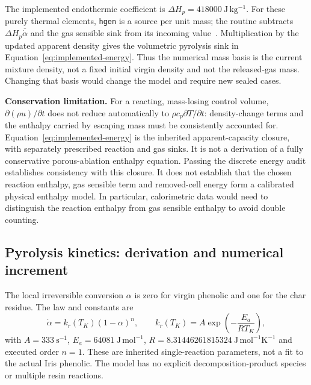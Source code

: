 The implemented endothermic coefficient is $\Delta H_p=418000\ \mathrm{J\,kg^{-1}}$. For these purely thermal elements, \texttt{hgen} is a source per unit mass; the routine subtracts $\Delta H_p\overline{\dot\alpha}$ and the gas sensible sink from its incoming value~\cite{ansysusermat}. Multiplication by the updated apparent density gives the volumetric pyrolysis sink in Equation~\eqref{eq:implemented-energy}. Thus the numerical mass basis is the current mixture density, not a fixed initial virgin density and not the released-gas mass. Changing that basis would change the model and require new sealed cases.

\textbf{Conservation limitation.} For a reacting, mass-losing control volume, $\partial(\rho u)/\partial t$ does not reduce automatically to $\rho c_p\partial T/\partial t$: density-change terms and the enthalpy carried by escaping mass must be consistently accounted for. Equation~\eqref{eq:implemented-energy} is the inherited apparent-capacity closure, with separately prescribed reaction and gas sinks. It is not a derivation of a fully conservative porous-ablation enthalpy equation. Passing the discrete energy audit establishes consistency with this closure. It does not establish that the chosen reaction enthalpy, gas sensible term and removed-cell energy form a calibrated physical enthalpy model. In particular, calorimetric data would need to distinguish the reaction enthalpy from gas sensible enthalpy to avoid double counting.

\subsection{Pyrolysis kinetics: derivation and numerical increment}
The local irreversible conversion $\alpha$ is zero for virgin phenolic and one for the char residue. The law and constants are
\begin{equation}
 \dot\alpha=k_r(T_K)(1-\alpha)^n,\qquad
 k_r(T_K)=A\exp\!\left(-\frac{E_a}{RT_K}\right),
\end{equation}
with $A=333\ \mathrm{s^{-1}}$, $E_a=64081\ \mathrm{J\,mol^{-1}}$, $R=8.31446261815324\ \mathrm{J\,mol^{-1}K^{-1}}$ and executed order $n=1$. These are inherited single-reaction parameters, not a fit to the actual Iris phenolic. The model has no explicit decomposition-product species or multiple resin reactions.

